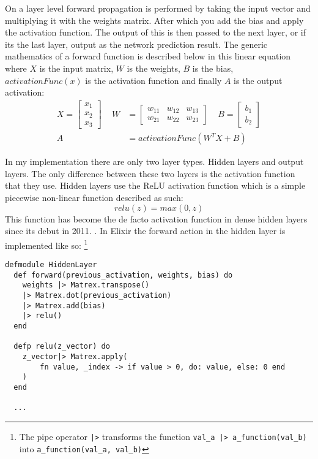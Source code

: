 On a layer level forward propagation is performed by taking the input vector and
multiplying it with the weights matrix. After which you add the bias and apply
the activation function. The output of this is then passed to the next layer, or
if its the last layer, output as the network prediction result. The generic
mathematics of a forward function is described below in this linear equation
where  \(X\) is the input matrix, \(W\) is the weights, \(B\) is the bias,
\(activationFunc(x)\) is the activation function and finally \(A\) is the output
activation:
\begin{equation}
    \begin{aligned}
        X = \begin{bmatrix}
            x_{1} \\
            x_{2} \\
            x_{3}
        \end{bmatrix} \, \, \, \, \, \, \,
        W &= \begin{bmatrix}
            w_{11} & w_{12} & w_{13} \\
            w_{21} & w_{22} & w_{23}
        \end{bmatrix} \, \, \, \, \, \, \,
        B = \begin{bmatrix}
            b_{1} \\
            b_{2}
        \end{bmatrix} \\[10pt]
        A &= activationFunc( W^{T}X + B )
    \end{aligned}
\end{equation}

In my implementation there are only two layer types. Hidden layers and output
layers. The only difference between these two layers is the activation function
that they use. Hidden layers use the ReLU activation function which is a simple
piecewise non-linear function described as such:
\begin{equation}
    relu(z) = max(0,z)
\end{equation}
\clearpage
This function has become the de facto activation function in dense hidden
layers since its debut in 2011. \cite{glorot2011deep}. In Elixir the forward
action in the hidden layer is implemented like so: \footnote{The pipe operator
\lstinline{|>} transforms the function \lstinline{val_a |> a_function(val_b)}
into \lstinline{a_function(val_a, val_b)}}
\begin{lstlisting}
defmodule HiddenLayer
  def forward(previous_activation, weights, bias) do
    weights |> Matrex.transpose()
    |> Matrex.dot(previous_activation)
    |> Matrex.add(bias)
    |> relu()
  end

  defp relu(z_vector) do
    z_vector|> Matrex.apply(
        fn value, _index -> if value > 0, do: value, else: 0 end
    )
  end

  ...
\end{lstlisting}


